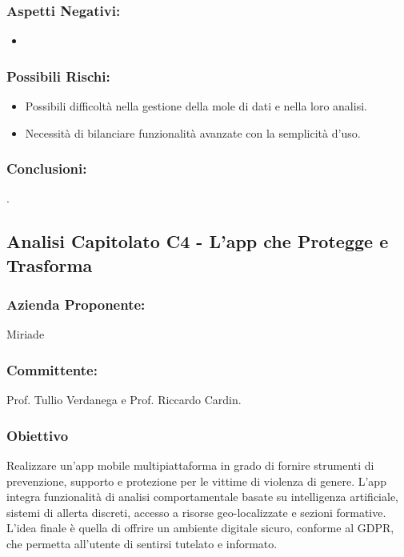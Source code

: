 \documentclass[a4paper,12pt]{article}
\begin{document}
\subsubsection*{Aspetti Negativi:}
\begin{itemize}
    \item 
\end{itemize}

\subsubsection*{Possibili Rischi:}
\begin{itemize}
    \item Possibili difficoltà nella gestione della mole di dati e nella loro analisi.
    \item Necessità di bilanciare funzionalità avanzate con la semplicità d'uso.
\end{itemize}

\subsubsection*{Conclusioni:}
. 



\subsection{Analisi Capitolato C4 - L’app che Protegge e Trasforma}
\subsubsection*{Azienda Proponente:} Miriade
\subsubsection*{Committente:} Prof. Tullio Verdanega e Prof. Riccardo Cardin.
\subsubsection*{Obiettivo}
Realizzare un’app mobile multipiattaforma in grado di fornire strumenti di prevenzione, supporto e protezione per le vittime di violenza di genere.  
L’app integra funzionalità di analisi comportamentale basate su intelligenza artificiale, sistemi di allerta discreti, accesso a risorse geo-localizzate e sezioni formative.  
L’idea finale è quella di offrire un ambiente digitale sicuro, conforme al GDPR, che permetta all’utente di sentirsi tutelato e informato.
\end{document}
